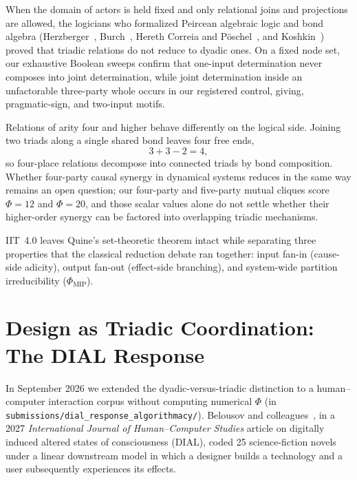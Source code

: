 \documentclass[11pt,a4paper]{article}
\begin{document}
When the domain of actors is held fixed and only relational joins and projections are allowed, the logicians who formalized Peircean algebraic logic and bond algebra (Herzberger~\cite{herzberger1981theorem}, Burch~\cite{burch1991reduction}, Hereth Correia and P\"oschel~\cite{herethposchel2006teridentity}, and Koshkin~\cite{koshkin2025completeness}) proved that triadic relations do not reduce to dyadic ones. On a fixed node set, our exhaustive Boolean sweeps confirm that one-input determination never composes into joint determination, while joint determination inside an unfactorable three-party whole occurs in our registered control, giving, pragmatic-sign, and two-input motifs.

Relations of arity four and higher behave differently on the logical side. Joining two triads along a single shared bond leaves four free ends,
\begin{equation}
  3 + 3 - 2 = 4, \label{eq:valency}
\end{equation}
so four-place relations decompose into connected triads by bond composition. Whether four-party causal synergy in dynamical systems reduces in the same way remains an open question; our four-party and five-party mutual cliques score $\Phi = 12$ and $\Phi = 20$, and those scalar values alone do not settle whether their higher-order synergy can be factored into overlapping triadic mechanisms.

IIT~4.0 leaves Quine's set-theoretic theorem intact while separating three properties that the classical reduction debate ran together: input fan-in (cause-side adicity), output fan-out (effect-side branching), and system-wide partition irreducibility ($\Phi_{\mathrm{MIP}}$).

\section{Design as Triadic Coordination: The DIAL Response}

In September 2026 we extended the dyadic-versus-triadic distinction to a human--computer interaction corpus without computing numerical $\Phi$ (in \texttt{submissions/dial\_response\_algorithmacy/}). Belousov and colleagues~\cite{belousov2027dial}, in a 2027 \emph{International Journal of Human--Computer Studies} article on digitally induced altered states of consciousness (DIAL), coded 25 science-fiction novels under a linear downstream model in which a designer builds a technology and a user subsequently experiences its effects.
\end{document}
